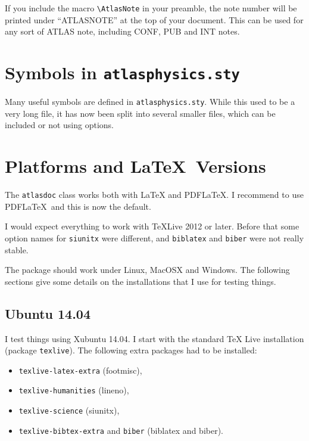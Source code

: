 \documentclass[koma,UKenglish]{style/atlasdoc}
\newcommand{\Macro}[1]{\texttt{\textbackslash #1}\xspace}
\begin{document}
If you include the macro \Macro{AtlasNote} in your preamble,
the note number will be printed under ``ATLASNOTE'' at the top of your document.
This can be used for any sort of ATLAS note, including CONF, PUB and INT notes.


\section{Symbols in \texttt{atlasphysics.sty}}
\label{sec:atlasphysics}

Many useful symbols are defined in \texttt{atlasphysics.sty}.
While this used to be a very long file, it has now been split into several smaller files,
which can be included or not using options.


\section{Platforms and \LaTeX\ Versions}
\label{sec:version}

The \texttt{atlasdoc} class works both with \LaTeX{} and PDF\LaTeX{}.
I recommend to use PDF\LaTeX\ and this is now the default.

I would expect everything to work with TeXLive 2012 or later.
Before that some option names for \texttt{siunitx} were different, and \texttt{biblatex} and \texttt{biber}
were not really stable.

The package should work under Linux, MacOSX and Windows.
The following sections give some details on the installations that I use for testing things.

\subsection{Ubuntu 14.04}

I test things using Xubuntu 14.04.
I start with the standard TeX Live installation (package \texttt{texlive}).
The following extra packages had to be installed:
\begin{itemize}\setlength{\parskip}{0pt}\setlength{\itemsep}{0pt}
\item \texttt{texlive-latex-extra} (footmisc),
\item \texttt{texlive-humanities} (lineno),
\item \texttt{texlive-science} (siunitx),
\item \texttt{texlive-bibtex-extra} and \texttt{biber} (biblatex and biber).
\end{itemize}
\end{document}
